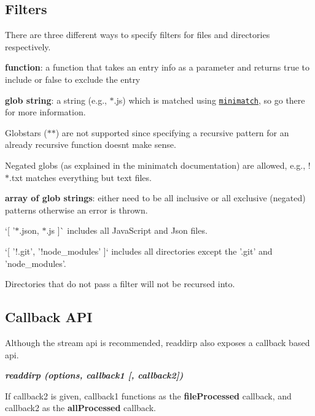 \subsection*{Filters}

There are three different ways to specify filters for files and directories respectively.


\begin{DoxyItemize}
\item {\bfseries function}\+: a function that takes an entry info as a parameter and returns true to include or false to exclude the entry
\item {\bfseries glob string}\+: a string (e.\+g., {\ttfamily $\ast$.js}) which is matched using \href{https://github.com/isaacs/minimatch}{\tt minimatch}, so go there for more information.

Globstars ({\ttfamily $\ast$$\ast$}) are not supported since specifying a recursive pattern for an already recursive function doesn\textquotesingle{}t make sense.

Negated globs (as explained in the minimatch documentation) are allowed, e.\+g., {\ttfamily !$\ast$.txt} matches everything but text files.
\item {\bfseries array of glob strings}\+: either need to be all inclusive or all exclusive (negated) patterns otherwise an error is thrown.

`\mbox{[} '$\ast$.json\textquotesingle{}, \textquotesingle{}$\ast$.js\textquotesingle{} \mbox{]}\`{} includes all Java\+Script and Json files.
\end{DoxyItemize}

\begin{DoxyVerb}`[ '!.git', '!node_modules' ]` includes all directories except the '.git' and 'node_modules'.
\end{DoxyVerb}


Directories that do not pass a filter will not be recursed into.

\subsection*{Callback A\+PI}

Although the stream api is recommended, readdirp also exposes a callback based api.

{\itshape {\bfseries readdirp (options, callback1 \mbox{[}, callback2\mbox{]})}}

If callback2 is given, callback1 functions as the {\bfseries file\+Processed} callback, and callback2 as the {\bfseries all\+Processed} callback.

